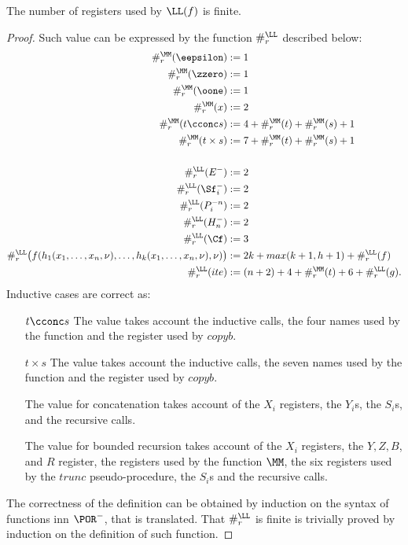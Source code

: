 \begin{remark}
The number of registers
used by $\LL(f)$ is finite.
\end{remark}
\begin{proof}
Such value can be expressed by the function
$\#^{\LL}_r$ described below:
\begin{align*}
\#^{\MM}_r({\eepsilon}) &:= 1 \\
%
\#^{\MM}_r({\zzero}) &:= 1 \\
%
\#^{\MM}_r({\oone}) &:= 1 \\
%
\#^{\MM}_r(x) &:= 2 \\
%
\#^{\MM}_r(t{\cconc} s)
&:= 4 + \#^{\MM}_r(t) +
\#^{\MM}_r(s) + 1 \\
%
\#^{\MM}_r(t\times s) &:= 7 +
\#^{\MM}_r(t) + \#^{\MM}_r(s) + 1 \\
%
\\
%
\#^{\LL}_r(E^-) &:= 2 \\
%
\#^{\LL}_r(\Sf_i^-) &:= 2 \\
%
\#^{\LL}_r(P^{-n}_i) &:= 2 \\
%
\#^{\LL}_r(H^-_n) &:= 2 \\
%
\#^{\LL}_r(\Cf) &:= 3 \\
%
\#^{\LL}_r\big(f(h_1(x_1,\dots, x_n,\nu),
\dots, h_k(x_1,\dots, x_n,\nu),\nu)\big)
&:= 2k + max(k+1,h+1) + \#^{\LL}_r(f) \\
%
\#^{\LL}_r(ite) &:= (n+2)+4
+ \#^{\MM}_r(t) + 6 + \#^{\LL}_r(g).
\end{align*}
Inductive cases are correct as:
\begin{itemize}
\item[$t\cconc s$] The value {takes
account} the inductive calls,
the four names used by the function and
the register used by $copyb$.
\item[$t\times s$] The value {takes
account} the inductive calls, the seven names
used by the function
and the register used by $copyb$.
\item[] The value for concatenation
{takes account}
of the $X_i$ registers,
the $Y_i$s, the $S_i$s,
and the recursive calls.
\item[] The value for bounded recursion
{takes account}
of the $X_i$ registers, the $Y, Z, B$,
and $R$ register, the registers used by
the function $\MM$, the six registers used
by the $trunc$ pseudo-procedure{,} the $S_i$s
and the recursive calls.
\end{itemize}
The correctness of the definition
can be obtained by induction on the syntax
of functions inn $\POR^-$, that is translated.
That $\#^{\LL}_r$
is finite is trivially proved by induction
on the definition of such function.
\end{proof}









